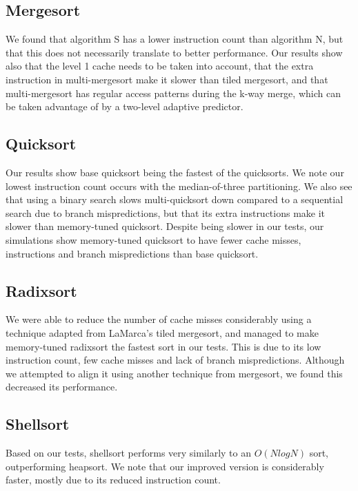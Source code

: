 \subsection{Mergesort}

We found that algorithm S has a lower instruction count than algorithm N, but
that this does not necessarily translate to better performance. Our results show
also that the level 1 cache needs to be taken into account, that the extra
instruction in multi-mergesort make it slower than tiled mergesort, and that
multi-mergesort has regular access patterns during the k-way merge, which can be
taken advantage of by a two-level adaptive predictor.


\subsection{Quicksort}

Our results show base quicksort being the fastest of the quicksorts. We note our
lowest instruction count occurs with the median-of-three partitioning. We also
see that using a binary search slows multi-quicksort down compared to a
sequential search due to branch mispredictions, but that its extra instructions
make it slower than memory-tuned quicksort. Despite being slower in our tests,
our simulations show memory-tuned quicksort to have fewer cache misses,
instructions and branch mispredictions than base quicksort.


\subsection{Radixsort}

We were able to reduce the number of cache misses considerably using a technique
adapted from LaMarca's tiled mergesort, and managed to make memory-tuned radixsort the
fastest sort in our tests. This is due to its low instruction count, few cache
misses and lack of branch mispredictions. Although we attempted to align it
using another technique from mergesort, we found this decreased its performance.


\subsection{Shellsort}

Based on our tests, shellsort performs very similarly to an $O(NlogN)$ sort,
outperforming heapsort. We note that our improved version is considerably
faster, mostly due to its reduced instruction count.

